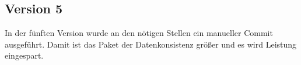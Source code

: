 \subsection{Version 5}\label{subsec:version5}
In der fünften Version wurde an den nötigen Stellen ein manueller Commit ausgeführt.
Damit ist das Paket der Datenkonsistenz größer und es wird Leistung eingespart.


